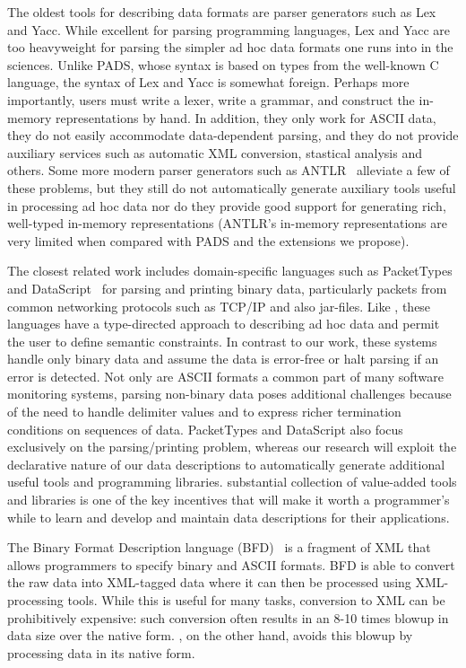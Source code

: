 \documentclass[11pt]{article}
\begin{document}
The oldest tools for describing data formats are parser generators such as
Lex and Yacc.  While excellent for parsing programming languages, Lex and Yacc
are too heavyweight for parsing the simpler ad hoc data formats one
runs into in the sciences.   
Unlike PADS, whose syntax is based on types from the well-known C language,
the syntax of Lex and Yacc is somewhat foreign.  Perhaps more importantly,
users must write a lexer, write a
grammar, and construct the in-memory representations by hand.  In
addition, they only work for ASCII data, they do not easily
accommodate data-dependent parsing, and they do not provide auxiliary
services such as automatic XML conversion, stastical analysis and
others.  Some more modern parser generators such as ANTLR~\cite{antlr} alleviate
a few of these problems, but they still do not automatically generate auxiliary tools
useful in processing ad hoc data nor do they provide good support for generating
rich, well-typed in-memory representations (ANTLR's in-memory representations
are very limited when compared with PADS and the extensions we propose).

The closest related work includes domain-specific
languages such as PacketTypes~\cite{sigcomm00} and DataScript~\cite{gpce02} 
for parsing and printing binary data, particularly packets
from common networking protocols such as \textsc{TCP/IP} and also
\java{} jar-files.  Like \pads{}, these languages have a type-directed
approach to describing ad hoc data and permit the user to define
semantic constraints.  In contrast to our work, these systems handle
only binary data and assume the data is error-free or halt parsing if
an error is detected.  Not only are ASCII formats a common part of
many software monitoring systems, parsing non-binary data poses additional
challenges because of the need to handle delimiter values and to
express richer termination conditions on sequences of data. 
PacketTypes and DataScript also focus exclusively on the 
parsing/printing problem,
whereas our research will exploit the declarative nature of our data
descriptions to automatically generate additional useful tools and
programming libraries.  \pads{} substantial 
collection of value-added tools and libraries is 
one of the key incentives that will make it
worth a programmer's while to learn \pads{}
and develop and maintain data descriptions for their applications.

The Binary Format Description language (BFD)~\cite{bfd} is a fragment of
XML that allows programmers to specify binary and ASCII formats.  BFD
is able to convert the raw data into XML-tagged data where it can then be
processed using XML-processing tools.  While this is useful for many
tasks, conversion to XML can be prohibitively expensive:  such conversion
often results in an 8-10 times blowup in data size over the native form.
\pads{}, on the other hand, avoids this blowup by processing data in its 
native form.
\end{document}
